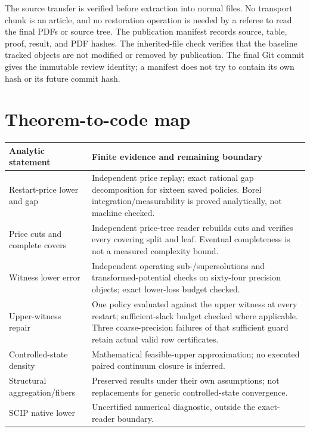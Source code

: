 The source transfer is verified before extraction into normal files. No transport chunk is an article, and no restoration operation is needed by a referee to read the final PDFs or source tree. The publication manifest records source, table, proof, result, and PDF hashes. The inherited-file check verifies that the baseline tracked objects are not modified or removed by publication. The final Git commit gives the immutable review identity; a manifest does not try to contain its own hash or its future commit hash.

\section{Theorem-to-code map}
\noindent\begin{tabularx}{\linewidth}{p{.25\linewidth}X}\toprule
Analytic statement&Finite evidence and remaining boundary\\\midrule
Restart-price lower and gap&Independent price replay; exact rational gap decomposition for sixteen saved policies. Borel integration/measurability is proved analytically, not machine checked.\\
Price cuts and complete covers&Independent price-tree reader rebuilds cuts and verifies every covering split and leaf. Eventual completeness is not a measured complexity bound.\\
Witness lower error&Independent operating sub-/supersolutions and transformed-potential checks on sixty-four precision objects; exact lower-loss budget checked.\\
Upper-witness repair&One policy evaluated against the upper witness at every restart; sufficient-slack budget checked where applicable. Three coarse-precision failures of that sufficient guard retain actual valid row certificates.\\
Controlled-state density&Mathematical feasible-upper approximation; no executed paired continuum closure is inferred.\\
Structural aggregation/fibers&Preserved results under their own assumptions; not replacements for generic controlled-state convergence.\\
SCIP native lower&Uncertified numerical diagnostic, outside the exact-reader boundary.\\\bottomrule
\end{tabularx}

